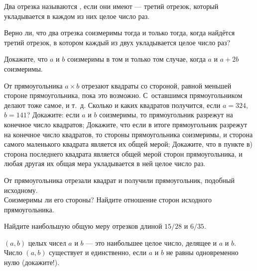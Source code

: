 \documentclass[a4paper,11pt]{article}
\begin{document}



Два отрезка называются , если они имеют
 --- третий отрезок, который укладывается
в каждом из них целое число раз.

Верно ли, что два отрезка соизмеримы тогда и только тогда, когда
найд\"ется третий отрезок, в котором каждый из двух укладывается
целое число раз?

Докажите, что
$a$ и $b$ соизмеримы в том и только том случае, когда
$a$ и $a+2b$ соизмеримы.

От прямоугольника %
$a\times b$ отрезают квадраты со стороной, равной меньшей стороне
прямоугольника, пока это возможно. %
С~оставшимся прямоугольником делают тоже самое,
и т.~д.
Сколько и каких квадратов получится, если
$a=324$, $b=141$?
Докажите: если $a$ и $b$ %
соизмеримы, то
прямоугольник разрежут на конечное число квадратов;
Докажите, что если в итоге прямоугольник разрежут на
конечное число квадратов, то стороны прямоугольника соизмеримы, и
сторона %
самого маленького
квадрата является их общей мерой;
Докажите, что в пункте в)
сторона последнего квадрата является 
общей мерой сторон прямоугольника, и любая другая их общая мера
укладывается в ней целое число раз.

От прямоугольника отрезали квадрат и получили прямоугольник,
подобный исходному.\\
Соизмеримы ли его стороны?
Найдите отношение сторон исходного прямоугольника.

Найдите наибольшую общую меру отрезков длиной
$15/28$ и $6/35$.

 $(a,b)$ целых чисел $a$ и $b$
--- это %
наибольшее целое число, делящее и $a$ и $b$.
Число $(a,b)$ существует и единственно,
если $a$ и $b$ не равны одновременно нулю (докажите!).
\end{document}

